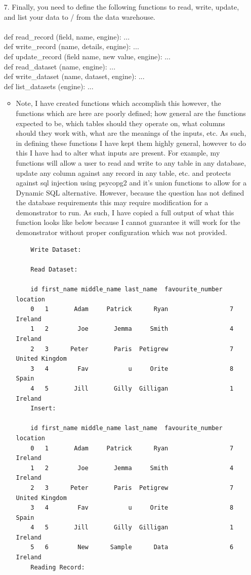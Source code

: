 \documentclass{scrreprt}
\begin{document}
\begin{enumerate}
	\item[7.] Finally, you need to define the following functions to read, write, update, and list your data to / from the data warehouse.
	\\
	\\
	def read\_record (field, name, engine): ...
	\\
	def write\_record (name, details, engine): ...
	\\
	def update\_record (field name, new value, engine):  ...
	\\
	def read\_dataset (name, engine):  ...
	\\
	def write\_dataset (name, dataset, engine):  ...
	\\
	def list\_datasets (engine):  ...
\begin{itemize}
	\item Note, I have created functions which accomplish this however, the functions which are here are poorly defined; how general are the functions expected to be, which tables should they operate on, what columns should they work with, what are the meanings of the inputs, etc. As such, in defining these functions I have kept them highly general, however to do this I have had to alter what inputs are present. For example, my functions will allow a user to read and write to any table in any database, update any column against any record in any table, etc. and protects against sql injection using psycopg2 and it's union functions to allow for a Dynamic SQL alternative. However, because the question has not defined the database requirements this may require modification for a demonstrator to run. As such, I have copied a full output of what this function looks like below because I cannot guarantee it will work for the demonstrator without proper configuration which was not provided.
\begin{lstlisting}
	Write Dataset:
	
	Read Dataset:
	
	id first_name middle_name last_name  favourite_number        location
	0   1       Adam     Patrick      Ryan                 7         Ireland
	1   2        Joe       Jemma     Smith                 4         Ireland
	2   3      Peter       Paris  Petigrew                 7  United Kingdom
	3   4        Fav           u     Orite                 8           Spain
	4   5       Jill       Gilly  Gilligan                 1         Ireland
	Insert:
	
	id first_name middle_name last_name  favourite_number        location
	0   1       Adam     Patrick      Ryan                 7         Ireland
	1   2        Joe       Jemma     Smith                 4         Ireland
	2   3      Peter       Paris  Petigrew                 7  United Kingdom
	3   4        Fav           u     Orite                 8           Spain
	4   5       Jill       Gilly  Gilligan                 1         Ireland
	5   6        New      Sample      Data                 6         Ireland
	Reading Record:
	

\end{lstlisting}
\end{itemize}
\end{enumerate}
\end{document}
